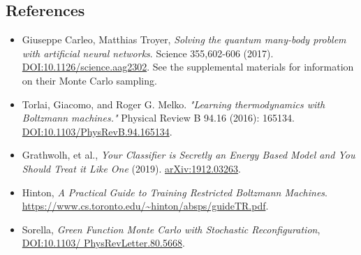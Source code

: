 \documentclass{report}
\begin{document}
\subsection*{References}
\begin{itemize}[itemsep=0.2ex]
\item Giuseppe Carleo, Matthias Troyer, \textit{Solving the quantum many-body problem
with artificial neural networks}. Science 355,602-606 (2017).
\href{https://doi.org/10.1126/science.aag2302}{DOI:10.1126/science.aag2302}. 
See the supplemental materials for information on their Monte Carlo sampling.
\item Torlai, Giacomo, and Roger G. Melko. \textit{"Learning thermodynamics with
Boltzmann machines."} Physical Review B 94.16 (2016): 165134.
\href{https://doi.org/10.1103/PhysRevB.94.165134}{DOI:10.1103/PhysRevB.94.165134}.
\item Grathwolh, et al., \textit{Your Classifier is Secretly an Energy Based Model and You Should Treat it Like One} (2019).
 \href{https://arxiv.org/abs/1912.03263}{arXiv:1912.03263}.
\item Hinton, \textit{A Practical Guide to Training
Restricted Boltzmann Machines}. \url{https://www.cs.toronto.edu/~hinton/absps/guideTR.pdf}.
\item Sorella, \textit{Green Function Monte Carlo with Stochastic Reconfiguration},
 \href{https://journals.aps.org/prl/abstract/10.1103/PhysRevLett.80.4558}{DOI:10.1103/ PhysRevLetter.80.5668}.
\end{itemize}


\end{document}
